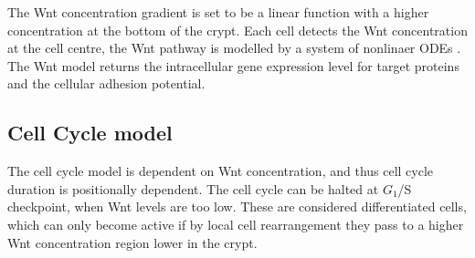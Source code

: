 \documentclass[11pt]{article} %
\begin{document}
The Wnt concentration gradient is set to be a linear function with a higher concentration at the bottom of the crypt. Each cell detects the Wnt concentration at the cell centre, the Wnt pathway is modelled by a system of nonlinaer ODEs \cite{vanLeeuwen2007}. The Wnt model returns the intracellular gene expression level for target proteins and the cellular adhesion potential.

\subsection{Cell Cycle model}

The cell cycle model is dependent on Wnt concentration, and thus cell cycle duration is positionally dependent. The cell cycle can be halted at $G_1$/S checkpoint, when Wnt levels are too low. These are considered differentiated cells, which can only become active if by local cell rearrangement they pass to a higher Wnt concentration region lower in the crypt.

{}

\end{document}
